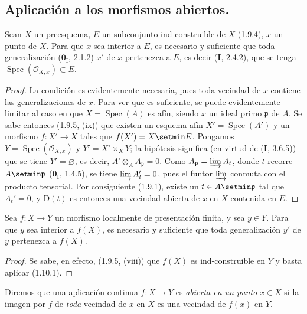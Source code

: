 \subsection{Aplicación a los morfismos abiertos.}
\label{subsection:IV.1.10-fr}

\begin{theorem}[1.10.1]
\label{IV.1.10.1-fr}
Sean $X$ un preesquema, $E$ un subconjunto ind-construible de $X$ \textup{(1.9.4)}, $x$
un punto de $X$. Para que $x$ sea interior a $E$, es necesario y suficiente que
toda generalización \textup{($\mathbf{0}_{\mathrm I}$, 2.1.2)} $x'$ de $x$ pertenezca a $E$,
es decir \textup{(\textbf{I}, 2.4.2)}, que se tenga
$\operatorname{Spec}(\mathcal O_{X,x})\subset E$.
\end{theorem}

\begin{proof}
La condición es evidentemente necesaria, pues toda vecindad de $x$ contiene las
generalizaciones de $x$. Para ver que es suficiente, se puede evidentemente
limitar al caso en que $X=\operatorname{Spec}(A)$ es afín, siendo $x$ un ideal primo
$\mathfrak p$ de $A$. Se sabe entonces (1.9.5, (ix)) que existen un esquema afín
$X'=\operatorname{Spec}(A')$ y un morfismo $f:X'\to X$ tales que
$f(X')=X\setmin E$. Pongamos $Y=\operatorname{Spec}(\mathcal O_{X,x})$ y
$Y'=X'\times_XY$; la hipótesis significa (en
virtud de (\textbf{I}, 3.6.5)) que se tiene $Y'=\varnothing$, es decir,
$A'\otimes_AA_{\mathfrak p}=0$. Como
$A_{\mathfrak p}=\varinjlim A_t$, donde $t$ recorre $A\setmin\mathfrak p$
($\mathbf{0}_{\mathrm I}$, 1.4.5), se tiene $\varinjlim A_t'=0$, pues el funtor
$\varinjlim$ conmuta con el producto tensorial. Por consiguiente (1.9.1), existe un
$t\in A\setmin\mathfrak p$ tal que $A_t'=0$, y $\mathrm D(t)$ es entonces una
vecindad abierta de $x$ en $X$ contenida en $E$.
\end{proof}

\begin{corollary}[1.10.2]
\label{IV.1.10.2-fr}
Sea $f:X\to Y$ un morfismo localmente de presentación finita, y sea
$y\in Y$. Para que $y$ sea interior a $f(X)$, es necesario y suficiente que toda
generalización $y'$ de $y$ pertenezca a $f(X)$.
\end{corollary}

\begin{proof}
Se sabe, en efecto, (1.9.5, (viii)) que $f(X)$ es ind-construible en $Y$ y
basta aplicar (1.10.1).
\end{proof}

Diremos que una aplicación continua $f:X\to Y$ es \emph{abierta en un
punto} $x\in X$ si la imagen por $f$ de \emph{toda} vecindad de $x$ en $X$
es una vecindad de $f(x)$ en $Y$.

